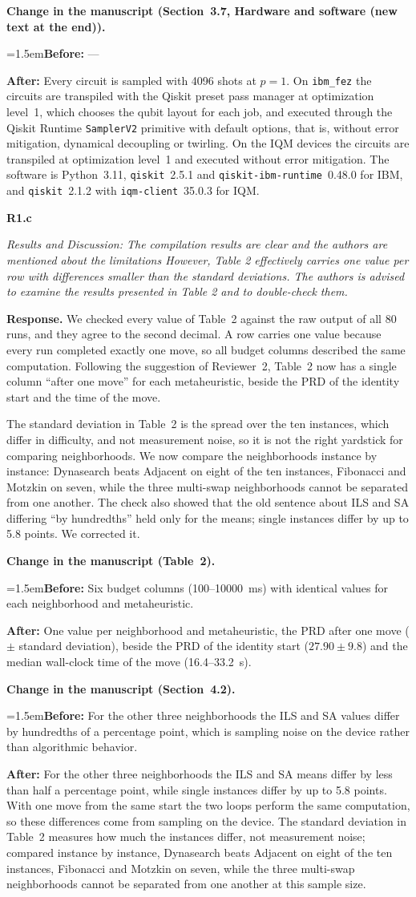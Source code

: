 \documentclass[11pt]{article}
\newenvironment{rc}[1]{\par\medskip\noindent\textbf{#1}\par\nopagebreak\noindent\itshape\ignorespaces}{\par}
\newcommand{\answer}[1]{\par\smallskip\noindent\textbf{Response.} #1\par}
\newcommand{\change}[3]{\par\smallskip\noindent\textbf{Change in the manuscript (#1).}\par
  {\leftskip=1.5em\noindent\textbf{Before:} #2\par\noindent\textbf{After:} #3\par}}
\begin{document}
\change{Section~3.7, Hardware and software (new text at the end)}{---}{Every circuit is sampled with 4096 shots at $p=1$. On \texttt{ibm\_fez} the circuits are transpiled with the Qiskit preset pass manager at optimization level~1, which chooses the qubit layout for each job, and executed through the Qiskit Runtime \texttt{SamplerV2} primitive with default options, that is, without error mitigation, dynamical decoupling or twirling. On the IQM devices the circuits are transpiled at optimization level~1 and executed without error mitigation. The software is Python~3.11, \texttt{qiskit}~2.5.1 and \texttt{qiskit-ibm-runtime}~0.48.0 for IBM, and \texttt{qiskit}~2.1.2 with \texttt{iqm-client}~35.0.3 for IQM.}

\begin{rc}{R1.c}
Results and Discussion: The compilation results are clear and the authors are mentioned about the limitations However, Table 2 effectively carries one value per row with differences smaller than the standard deviations. The authors is advised to examine the results presented in Table 2 and to double-check them.
\end{rc}
\answer{We checked every value of Table~2 against the raw output of all 80 runs, and they agree to the second decimal. A row carries one value because every run completed exactly one move, so all budget columns described the same computation. Following the suggestion of Reviewer~2, Table~2 now has a single column ``after one move'' for each metaheuristic, beside the PRD of the identity start and the time of the move.

The standard deviation in Table~2 is the spread over the ten instances, which differ in difficulty, and not measurement noise, so it is not the right yardstick for comparing neighborhoods. We now compare the neighborhoods instance by instance: Dynasearch beats Adjacent on eight of the ten instances, Fibonacci and Motzkin on seven, while the three multi-swap neighborhoods cannot be separated from one another. The check also showed that the old sentence about ILS and SA differing ``by hundredths'' held only for the means; single instances differ by up to 5.8 points. We corrected it.}
\change{Table~2}{Six budget columns (100--10000~ms) with identical values for each neighborhood and metaheuristic.}{One value per neighborhood and metaheuristic, the PRD after one move ($\pm$ standard deviation), beside the PRD of the identity start ($27.90\pm9.8$) and the median wall-clock time of the move (16.4--33.2~s).}
\change{Section~4.2}{For the other three neighborhoods the ILS and SA values differ by hundredths of a percentage point, which is sampling noise on the device rather than algorithmic behavior.}{For the other three neighborhoods the ILS and SA means differ by less than half a percentage point, while single instances differ by up to 5.8 points. With one move from the same start the two loops perform the same computation, so these differences come from sampling on the device. The standard deviation in Table~2 measures how much the instances differ, not measurement noise; compared instance by instance, Dynasearch beats Adjacent on eight of the ten instances, Fibonacci and Motzkin on seven, while the three multi-swap neighborhoods cannot be separated from one another at this sample size.}
\end{document}
